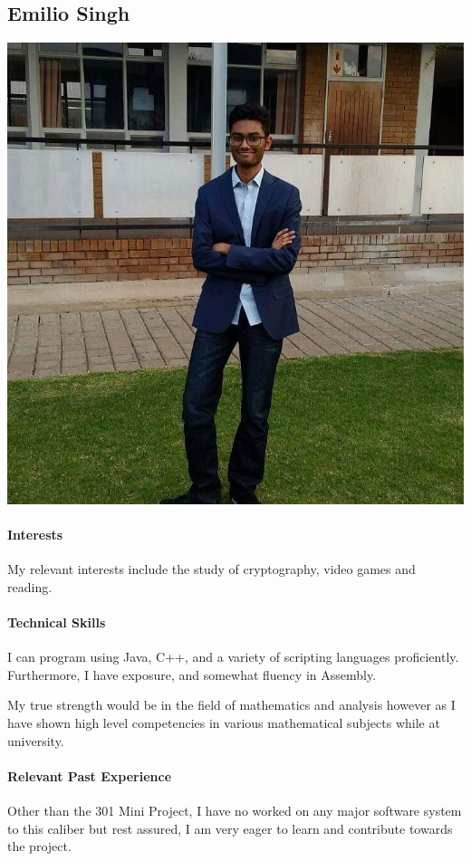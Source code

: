 \documentclass[12pt]{article}
\begin{document}
\subsection{Emilio Singh}
\includegraphics[scale=0.2]{Emilio}
\paragraph{Interests}
My relevant interests include the study of cryptography, video games and reading.
\paragraph{Technical Skills}
I can program using Java, C++, and a variety of scripting languages proficiently.
Furthermore, I have exposure, and somewhat fluency in Assembly.

My true strength would be in the field of mathematics and analysis however as I have shown high level competencies in various mathematical subjects while at university.
\paragraph{Relevant Past Experience}
Other than the 301 Mini Project, I have no worked on any major software system to this caliber but rest assured, I am very eager to learn and contribute towards the project.
\end{document}
